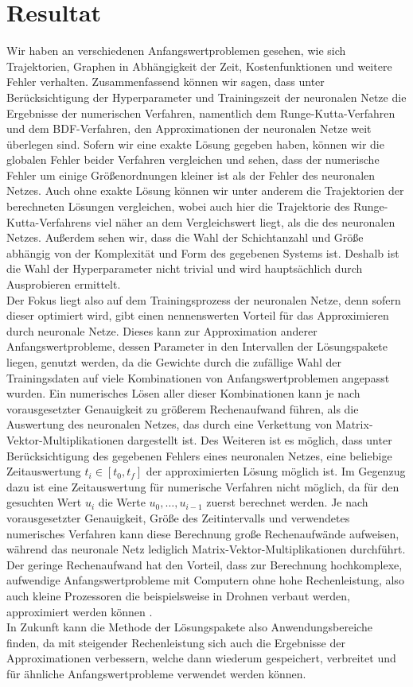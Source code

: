 \section{Resultat}
\label{sec:resultat}
Wir haben an verschiedenen Anfangswertproblemen gesehen, wie sich Trajektorien, Graphen in Abhängigkeit der Zeit,
Kostenfunktionen und weitere Fehler verhalten. Zusammenfassend können wir sagen, dass unter Berücksichtigung der
Hyperparameter und Trainingszeit der neuronalen Netze die Ergebnisse der numerischen Verfahren, namentlich dem
Runge-Kutta-Verfahren und dem BDF-Verfahren, den Approximationen der neuronalen Netze weit überlegen sind. Sofern wir
eine exakte Lösung gegeben haben, können wir die globalen Fehler beider Verfahren vergleichen und sehen, dass der
numerische Fehler um einige Größenordnungen kleiner ist als der Fehler des neuronalen Netzes.
Auch ohne exakte Lösung können wir unter anderem die Trajektorien der berechneten Lösungen vergleichen, wobei auch hier
die Trajektorie des Runge-Kutta-Verfahrens viel näher an dem Vergleichswert liegt, als die des neuronalen Netzes.
Außerdem sehen wir, dass die Wahl der Schichtanzahl und Größe abhängig von der Komplexität und Form des gegebenen
Systems ist. Deshalb ist die Wahl der Hyperparameter nicht trivial und wird hauptsächlich durch Ausprobieren ermittelt.\\
Der Fokus liegt also auf dem Trainingsprozess der neuronalen Netze, denn sofern dieser optimiert wird, gibt einen
nennenswerten Vorteil für das Approximieren durch neuronale Netze. Dieses kann zur Approximation anderer
Anfangswertprobleme, dessen Parameter in den Intervallen der Lösungspakete liegen, genutzt werden, da die Gewichte
durch die zufällige Wahl der Trainingsdaten auf viele Kombinationen von Anfangswertproblemen angepasst wurden. Ein
numerisches Lösen aller dieser Kombinationen kann je nach vorausgesetzter Genauigkeit zu größerem Rechenaufwand führen,
als die Auswertung des neuronalen Netzes, das durch eine Verkettung von Matrix-Vektor-Multiplikationen dargestellt ist.
Des Weiteren ist es möglich, dass unter Berücksichtigung des gegebenen Fehlers eines neuronalen Netzes, eine beliebige
Zeitauswertung $t_i \in [t_0, t_f]$ der approximierten Lösung möglich ist. Im Gegenzug dazu ist eine Zeitauswertung für
numerische Verfahren nicht möglich, da für den gesuchten Wert $u_i$ die Werte $ u_0, \dots, u_{i-1}$ zuerst berechnet
werden. Je nach vorausgesetzter Genauigkeit, Größe des Zeitintervalls und verwendetes numerisches Verfahren kann diese
Berechnung große Rechenaufwände aufweisen, während das neuronale Netz lediglich Matrix-Vektor-Multiplikationen
durchführt. Der geringe Rechenaufwand hat den Vorteil, dass zur Berechnung hochkomplexe, aufwendige Anfangswertprobleme
mit Computern ohne hohe Rechenleistung, also auch kleine Prozessoren die beispielsweise in Drohnen verbaut werden,
approximiert werden können \cite[9]{flamantSolvingDifferentialEquations2020}.\\
In Zukunft kann die Methode der Lösungspakete also Anwendungsbereiche finden, da mit steigender Rechenleistung sich auch
die Ergebnisse der Approximationen verbessern, welche dann wiederum gespeichert, verbreitet und für ähnliche
Anfangswertprobleme verwendet werden können.
